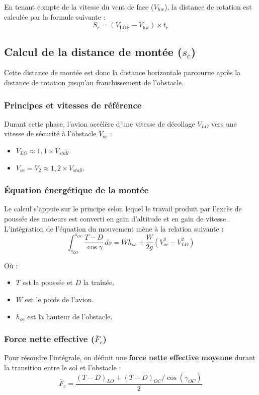  		En tenant compte de la vitesse du vent de face ($V_{hw}$), la distance de rotation est calculée par la formule suivante :
 		\[
 		S_r = (V_{\text{LOF}} - V_{\text{hw}}) \times t_r
 		\]
 	
 	\vspace*{1cm}
 		\subsection{Calcul de la distance de montée ($s_c$)}
 		Cette distance de montée est donc la distance horizontale parcourue après la distance de rotation jusqu'au franchissement de l'obstacle.
 		
 		\subsubsection{ Principes et vitesses de référence}
 		Durant cette phase, l'avion accélère d'une vitesse de décollage $V_{LO}$ vers une vitesse de sécurité à l'obstacle $V_{oc}$  :
 		\begin{itemize}
 			\item $V_{LO} \approx 1,1 \times V_{stall}$.
 			\item $V_{oc} = V_2 \approx 1,2 \times V_{stall}$.
 		\end{itemize}
 		
 		\subsubsection{Équation énergétique de la montée}
 		Le calcul s'appuie sur le principe selon lequel le travail produit par 
 		l'excès de poussée des moteurs est converti en gain d'altitude et en 
 		gain de vitesse . L'intégration de l'équation du mouvement mène à la relation suivante :
 		\[ \int_{s_{LO}}^{s_{OC}} \frac{T - D}{\cos \gamma} \, ds = W h_{oc} + \frac{W}{2g} (V_{oc}^2 - V_{LO}^2) \]
 		
 		Où :
 		\begin{itemize}
 			\item $T$ est la poussée et $D$ la traînée.
 			\item $W$ est le poids de l'avion.
 			\item $h_{oc}$ est la hauteur de l'obstacle.
 		\end{itemize}
 		
 		\subsubsection{ Force nette effective ($\bar{F}_c$)}
 		Pour résoudre l'intégrale, on définit une \textbf{force nette effective moyenne} durant la transition entre le sol et l'obstacle  :
 		\[ \bar{F}_c = \frac{(T - D)_{LO} + (T - D)_{OC} / \cos(\gamma_{OC})}{2}  \]
 		
